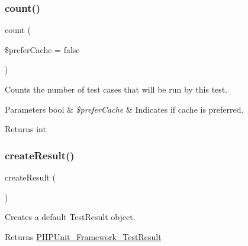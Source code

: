 \subsubsection{\texorpdfstring{count()}{count()}}
{\footnotesize\ttfamily count (\begin{DoxyParamCaption}\item[{}]{\$prefer\+Cache = {\ttfamily false} }\end{DoxyParamCaption})}

Counts the number of test cases that will be run by this test.


\begin{DoxyParams}[1]{Parameters}
bool & {\em \$prefer\+Cache} & Indicates if cache is preferred.\\
\hline
\end{DoxyParams}
\begin{DoxyReturn}{Returns}
int 
\end{DoxyReturn}
\mbox{\label{class_p_h_p_unit___framework___test_suite_a3f3ab385dd8747091f1bdfbb11ed6eca}} 
\subsubsection{\texorpdfstring{create\+Result()}{createResult()}}
{\footnotesize\ttfamily create\+Result (\begin{DoxyParamCaption}{ }\end{DoxyParamCaption})\hspace{0.3cm}{\ttfamily [protected]}}

Creates a default Test\+Result object.

\begin{DoxyReturn}{Returns}
\mbox{\hyperlink{class_p_h_p_unit___framework___test_result}{P\+H\+P\+Unit\+\_\+\+Framework\+\_\+\+Test\+Result}} 
\end{DoxyReturn}
\mbox{\label{class_p_h_p_unit___framework___test_suite_af96ca1c0b1be0abb3b9686a8010286d4}} 
